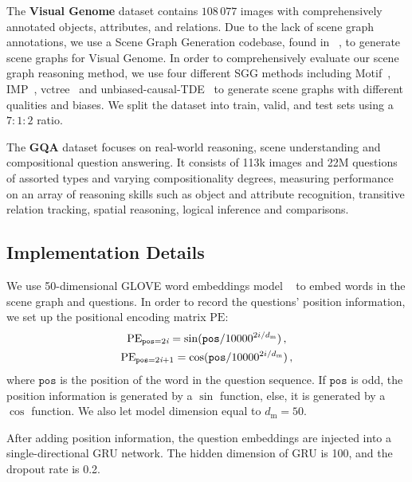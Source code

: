 \documentclass[letterpaper]{article} %
\begin{document}
\quad The \textbf{Visual Genome} dataset contains $108 \, 077$ images with comprehensively annotated objects, attributes, and relations. Due to the lack of scene graph annotations, we use a Scene Graph Generation codebase, found in ~\cite{tang2020sggcode}, to generate scene graphs for Visual Genome. 
In order to comprehensively evaluate our scene graph reasoning method, we use four different SGG methods including Motif~\cite{DBLP:conf/cvpr/ZellersYTC18}, IMP~\cite{DBLP:conf/cvpr/XuZCF17},  vctree~\cite{DBLP:conf/cvpr/TangZWLL19} and unbiased-causal-TDE~\cite{DBLP:conf/cvpr/TangNHSZ20} to generate scene graphs with different qualities and biases. 
We split the dataset into train, valid, and test sets using a $7:1:2$ ratio.

The \textbf{GQA} dataset focuses on real-world reasoning, scene understanding and compositional question answering. It consists of 113k images and 22M questions of assorted types and varying compositionality degrees, measuring performance on an array of reasoning skills such as object and attribute recognition, transitive relation tracking, spatial reasoning, logical inference and comparisons.



\subsection{Implementation Details}

We use 50-dimensional GLOVE word embeddings model ~\cite{pennington-etal-2014-glove} to embed words in the scene graph and questions. In order to record the questions' position information, we set up the positional encoding matrix $\textrm{PE}$:
\begin{gather}\notag
    \textrm{PE}_{\texttt{pos}=2\emph{i}} = \sin(\texttt{pos}/10000^{2i/d_{\textrm{m}}}) \, ,\\
    \textrm{PE}_{\texttt{pos}=2\emph{i}+1} = \cos(\texttt{pos}/10000^{2i/d_{\textrm{m}}}) \, , \notag
\end{gather}
where $\texttt{pos}$ is the position of the word in the question sequence. 
If $\texttt{pos}$ is odd, the position information is generated by a $\sin$ function, else, it is generated by a $\cos$ function. 
We also let model dimension equal to $d_{\textrm{m}}=50$.

After adding position information, the question embeddings are injected into a single-directional GRU network. 
The hidden dimension of GRU is 100, and the dropout rate is 0.2.
\end{document}

